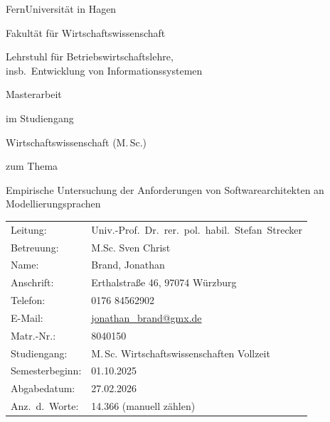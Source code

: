 \documentclass[%
draft=false,%
paper=a4,%
fontsize=12pt,%
pagesize=auto,%
twoside=false,%
headings=small,openany,%
chapterprefix=false,%
version=last,%
titlepage=true,%
parskip=half+,%
mpinclude=false,%
headsepline=true,%
numbers=noendperiod%
]{scrbook}
\makeatletter
\newcommand{\MSc}{M.\,Sc.\@\xspace}
\makeatother
\begin{document}
\frontmatter

\begin{titlepage}
\thispagestyle{empty}

\begin{center}
	\noindent\Huge FernUniversität in Hagen
	
	\bigskip
	
	\noindent\huge Fakultät für Wirtschaftswissenschaft
	
	\bigskip
	
	\noindent\normalsize Lehrstuhl für Betriebswirtschaftslehre,\\
	\noindent\normalsize insb.\ Entwicklung von Informationssystemen
	
	\vspace{3cm}
	
	\noindent\normalsize  Masterarbeit
	
	\smallskip
	
	\noindent\normalsize im Studiengang
	
	\smallskip
	
	\noindent\normalsize  Wirtschaftswissenschaft (\MSc)
	
	\smallskip
	
	\noindent\normalsize zum Thema
	
	\bigskip
		
	\begin{shaded}
		\centering Empirische Untersuchung der Anforderungen von Softwarearchitekten an Modellierungsprachen
	\end{shaded}	
	
	\vspace{1cm}
\end{center}

	\begin{tabular}{ll}
		Leitung:	&	Univ.-Prof.\ Dr.\ rer.\ pol.\ habil.\ Stefan~Strecker \\
		Betreuung:  &	M.Sc. Sven Christ\\
		Name:		&	Brand, Jonathan\\
		Anschrift:	&	Erthalstraße 46, 97074 Würzburg\\
		Telefon:	&	0176 84562902 \\
		E-Mail:		&	\href{mailto:jonathan_brand@gmx.de}{jonathan_brand@gmx.de}\\
		Matr.-Nr.:	& 	8040150\\
		Studiengang:	&	 \MSc Wirtschaftswissenschaften Vollzeit\\
		Semesterbeginn:	&	01.10.2025 \\
		Abgabedatum:	&	27.02.2026 \\
		Anz.\ d.\ Worte:	&	14.366 (manuell zählen)\\	
	\end{tabular}
	


\end{titlepage}
\end{document}

